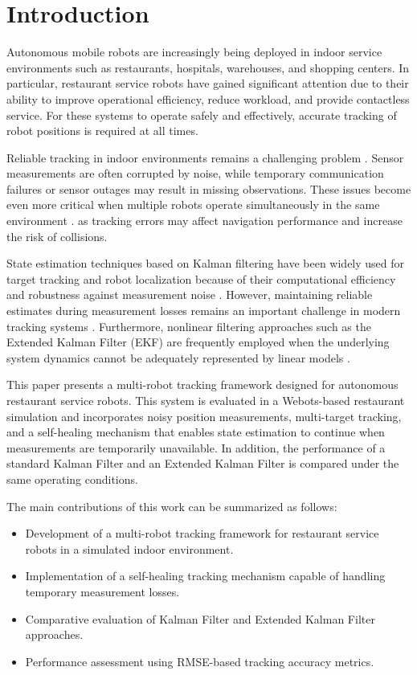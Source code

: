 \documentclass[conference]{IEEEtran}
\begin{document}
\section{Introduction}

Autonomous mobile robots are increasingly being deployed in indoor service environments such as restaurants, hospitals, warehouses, and shopping centers. In particular, restaurant service robots have gained significant attention due to their ability to improve operational efficiency, reduce workload, and provide contactless service. For these systems to operate safely and effectively, accurate tracking of robot positions is required at all times.

Reliable tracking in indoor environments remains a challenging problem \cite{thrun}. Sensor measurements are often corrupted by noise, while temporary communication failures or sensor outages may result in missing observations. These issues become even more critical when multiple robots operate simultaneously in the same environment \cite{multirobot}. as tracking errors may affect navigation performance and increase the risk of collisions.

State estimation techniques based on Kalman filtering have been widely used for target tracking and robot localization because of their computational efficiency and robustness against measurement noise \cite{kalman,welch,simon}. However, maintaining reliable estimates during measurement losses remains an important challenge in modern tracking systems \cite{tracking,barshalom}. Furthermore, nonlinear filtering approaches such as the Extended Kalman Filter (EKF) are frequently employed when the underlying system dynamics cannot be adequately represented by linear models \cite{ekf}.

This paper presents a multi-robot tracking framework designed for autonomous restaurant service robots. This system is evaluated in a Webots-based restaurant simulation and incorporates noisy position measurements, multi-target tracking, and a self-healing mechanism that enables state estimation to continue when measurements are temporarily unavailable. In addition, the performance of a standard Kalman Filter and an Extended Kalman Filter is compared under the same operating conditions.

The main contributions of this work can be summarized as follows:
\begin{itemize}
\item Development of a multi-robot tracking framework for restaurant service robots in a simulated indoor environment.
\item Implementation of a self-healing tracking mechanism capable of handling temporary measurement losses.
\item Comparative evaluation of Kalman Filter and Extended Kalman Filter approaches.
\item Performance assessment using RMSE-based tracking accuracy metrics.
\end{itemize}
\end{document}
